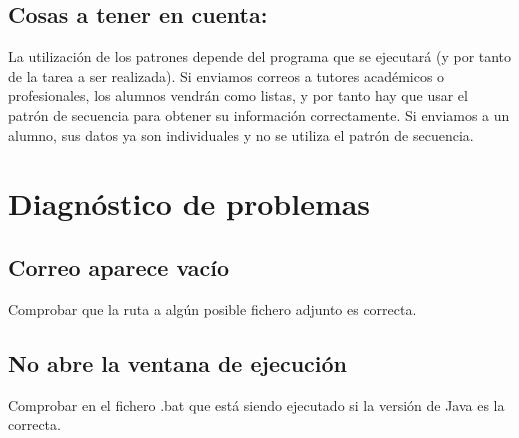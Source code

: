 \documentclass[11pt]{article}
\begin{document}
\subsection{Cosas a tener en cuenta:}
\label{sec-4-3}
La utilización de los patrones depende del programa que se ejecutará (y por tanto de la tarea a ser realizada). Si enviamos correos a tutores académicos o profesionales, los alumnos vendrán como listas, y por tanto hay que usar el patrón de secuencia para obtener su información correctamente. Si enviamos a un alumno, sus datos ya son individuales y no se utiliza el patrón de secuencia.

\section{Diagnóstico de problemas}
\label{sec-5}
\subsection{Correo aparece vacío}
\label{sec-5-1}
Comprobar que la ruta a algún posible fichero adjunto es correcta.
\subsection{No abre la ventana de ejecución}
\label{sec-5-2}
Comprobar en el fichero .bat que está siendo ejecutado si la versión de Java es la correcta.
\end{document}
